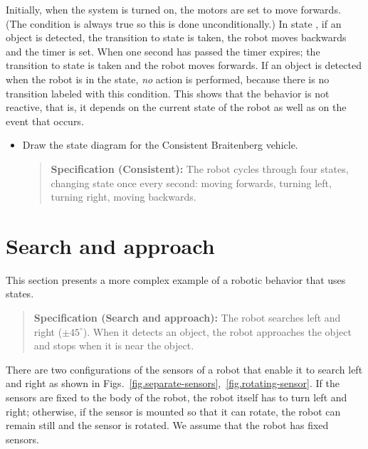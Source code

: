 Initially, when the system is turned on, the motors are set to move forwards. (The condition  is always true so this is done unconditionally.) In state , if an object is detected, the transition to state  is taken, the robot moves backwards and the timer is set. When one second has passed the timer expires; the transition to state  is taken and the robot moves forwards. If an object is detected when the robot is in the  state, \emph{no} action is performed, because there is no transition labeled with this condition. This shows that the behavior is not reactive, that is, it depends on the current state of the robot as well as on the event that occurs.

\begin{framed}
\begin{itemize}
\item Draw the state diagram for the Consistent Braitenberg vehicle.
\begin{quote}
\normalsize\noindent\textbf{Specification (Consistent):} The robot cycles through four states, changing state once every second: moving forwards, turning left, turning right, moving backwards.
\end{quote}
\end{itemize}
\end{framed}

\section{Search and approach}\label{s.search-and-approach}

This section presents a more complex example of a robotic behavior that uses states.

\begin{quote}
\normalsize\noindent\textbf{Specification (Search and approach):} The robot searches left and right ($\pm 45^\circ$). When it detects an object, the robot approaches the object and stops when it is near the object.
\end{quote}

There are two configurations of the sensors of a robot that enable it to search left and right as shown in Figs.~\ref{fig.separate-sensors},~\ref{fig.rotating-sensor}. If the sensors are fixed to the body of the robot, the robot itself has to turn left and right; otherwise, if the sensor is mounted so that it can rotate, the robot can remain still and the sensor is rotated. We assume that the robot has fixed sensors.

